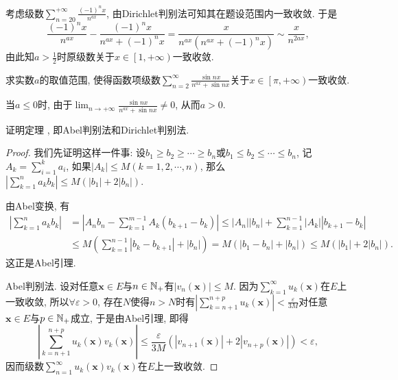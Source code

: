 \begin{quiza}
\begin{solution}
考虑级数\(\sum_{n=20}^{+\infty}\frac{(-1)^nx}{n^{ax}}\), 由Dirichlet判别法可知其在题设范围内一致收敛. 于是\[\frac{(-1)^nx}{n^{ax}}-\frac{(-1)^nx}{n^{ax}+(-1)^nx}=\frac{x}{n^{ax}\left(n^{ax}+(-1)^nx\right)}\sim\frac{x}{n^{2ax}},\]由此知\(a>\frac{1}{2}\)时原级数关于\(x\in\left[1,+\infty\right)\)一致收敛. 
\end{solution}
\woe 求实数\(a\)的取值范围, 使得函数项级数\(\sum_{n=2}^{\infty}\frac{\sin nx}{n^{ax}+\sin nx}\)关于\(x\in\left[\pi,+\infty\right)\)一致收敛.
\begin{solution}
当\(a\leqslant 0\)时, 由于\(\lim_{n\rightarrow+\infty}\frac{\sin nx}{n^{ax}+\sin nx}\ne 0\), 从而\(a>0\).

\end{solution}
\woe 证明定理 , 即Abel判别法和Dirichlet判别法.
\begin{proof}
我们先证明这样一件事: 设\(b_1\geqslant b_2\geqslant\cdots\geqslant b_n\)或\(b_1\leqslant b_2\leqslant\cdots\leqslant b_n\), 记\(A_k=\sum_{i=1}^{k}a_i\), 如果\(\left|A_k\right|\leqslant M(k=1,2,\cdots,n)\), 那么\(\left|\sum_{k=1}^{n}a_kb_k\right|\leqslant M(|b_1|+2|b_n|)\).

由Abel变换, 有\[\begin{split}
\left|\sum_{k=1}^{n}a_kb_k\right|&=\left|A_nb_n-\sum_{k=1}^{m-1}A_k(b_{k+1}-b_k)\right|\leqslant\left|A_n\right|\left|b_n\right|+\sum_{k=1}^{n-1}\left|A_k\right|\left|b_{k+1}-b_k\right|\\&\leqslant M\left(\sum_{k=1}^{n-1}\left|b_k-b_{k+1}\right|+|b_n|\right)= M\left(|b_1-b_n|+|b_n|\right)\leqslant M(|b_1|+2|b_n|).
\end{split}\]这正是Abel引理. 

Abel判别法. 设对任意\(\boldsymbol{x}\in E\)与\(n\in\mathbb{N}_+\)有\(\left|v_n(\boldsymbol{x})\right|\leqslant M\). 因为\(\sum_{k=1}^{\infty}u_k(\boldsymbol{x})\)在\(E\)上一致收敛, 所以\(\forall\varepsilon>0\), 存在\(N\)使得\(n>N\)时有\(\left|\sum_{k=n+1}^{n+p}u_k(\boldsymbol{x})\right|<\frac{\varepsilon}{3M}\)对任意\(\boldsymbol{x}\in E\)与\(p\in\mathbb{N}_+\)成立, 于是由Abel引理, 即得\[\left|\sum_{k=n+1}^{n+p}u_k(\boldsymbol{x})v_k(\boldsymbol{x})\right|\leqslant\frac{\varepsilon}{3M}\left(|v_{n+1}(\boldsymbol{x})|+2|v_{n+p}(\boldsymbol{x})|\right)<\varepsilon,\]因而级数\(\sum_{n=1}^{\infty}u_k(\boldsymbol{x})v_k(\boldsymbol{x})\)在\(E\)上一致收敛.


\end{proof}
\end{quiza}
